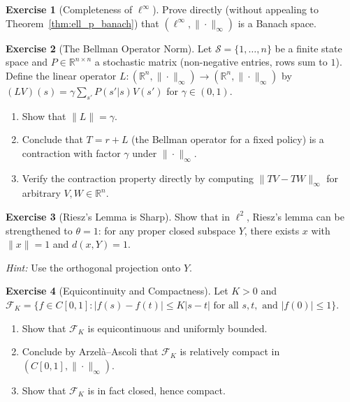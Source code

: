 \documentclass[11pt,a4paper]{article}
\theoremstyle{definition}
\newtheorem{exercise}{Exercise}[section]
\theoremstyle{plain}
\theoremstyle{remark}
\newcommand{\R}{\mathbb{R}}
\begin{document}
\begin{exercise}[Completeness of $\ell^\infty$]
\label{ex:ell_infty}
Prove directly (without appealing to Theorem~\ref{thm:ell_p_banach}) that
$(\ell^\infty, \|\cdot\|_\infty)$ is a Banach space.
\end{exercise}

\begin{exercise}[The Bellman Operator Norm]
\label{ex:bellman_norm}
Let $\mathcal{S} = \{1, \ldots, n\}$ be a finite state space and
$P \in \R^{n \times n}$ a stochastic matrix (non-negative entries, rows sum to $1$).
Define the linear operator $L \colon (\R^n, \|\cdot\|_\infty) \to
(\R^n, \|\cdot\|_\infty)$ by $(LV)(s) = \gamma \sum_{s'} P(s'|s) V(s')$ for
$\gamma \in (0,1)$.
\begin{enumerate}[nosep,label=(\alph*)]
    \item Show that $\|L\| = \gamma$.
    \item Conclude that $T = r + L$ (the Bellman operator for a fixed policy) is a
    contraction with factor $\gamma$ under $\|\cdot\|_\infty$.
    \item Verify the contraction property directly by computing
    $\|TV - TW\|_\infty$ for arbitrary $V, W \in \R^n$.
\end{enumerate}
\end{exercise}

\begin{exercise}[Riesz's Lemma is Sharp]
\label{ex:riesz_sharp}
Show that in $\ell^2$, Riesz's lemma can be strengthened to $\theta = 1$: for any
proper closed subspace $Y$, there exists $x$ with $\|x\| = 1$ and $d(x, Y) = 1$.

\noindent\textit{Hint:} Use the orthogonal projection onto $Y$.
\end{exercise}

\begin{exercise}[Equicontinuity and Compactness]
\label{ex:equicont}
Let $K > 0$ and $\mathcal{F}_K = \{f \in C[0,1] : |f(s) - f(t)| \le K|s-t|
\text{ for all } s, t, \text{ and } |f(0)| \le 1\}$.
\begin{enumerate}[nosep,label=(\alph*)]
    \item Show that $\mathcal{F}_K$ is equicontinuous and uniformly bounded.
    \item Conclude by Arzel\`{a}--Ascoli that $\mathcal{F}_K$ is relatively compact
    in $(C[0,1], \|\cdot\|_\infty)$.
    \item Show that $\mathcal{F}_K$ is in fact closed, hence compact.
\end{enumerate}
\end{exercise}
\end{document}
